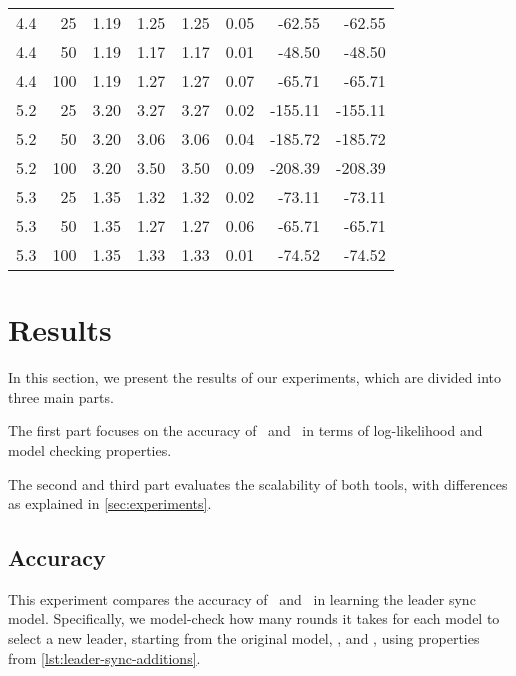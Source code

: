\begin{table}
\begin{tabular}{rrrrrrrr}
        4.4           & 25  & 1.19 & 1.25     & 1.25      & 0.05   & -62.55     & -62.55    \\
        4.4           & 50  & 1.19 & 1.17     & 1.17      & 0.01   & -48.50     & -48.50    \\
        4.4           & 100 & 1.19 & 1.27     & 1.27      & 0.07   & -65.71     & -65.71    \\
        5.2           & 25  & 3.20 & 3.27     & 3.27      & 0.02   & -155.11    & -155.11   \\
        5.2           & 50  & 3.20 & 3.06     & 3.06      & 0.04   & -185.72    & -185.72   \\
        5.2           & 100 & 3.20 & 3.50     & 3.50      & 0.09   & -208.39    & -208.39   \\
        5.3           & 25  & 1.35 & 1.32     & 1.32      & 0.02   & -73.11     & -73.11    \\
        5.3           & 50  & 1.35 & 1.27     & 1.27      & 0.06   & -65.71     & -65.71    \\
        5.3           & 100 & 1.35 & 1.33     & 1.33      & 0.01   & -74.52     & -74.52    \\
        \bottomrule
    \end{tabular}
\end{table}

\section{Results}\label{sec:results}
In this section, we present the results of our experiments, which are divided into three main parts.

The first part focuses on the accuracy of \Jajapy\ and \Cupaal\ in terms of log-likelihood and model checking properties.

The second and third part evaluates the scalability of both tools, with differences as explained in \autoref{sec:experiments}.

\subsection{Accuracy}\label{subsec:accuracy}
This experiment compares the accuracy of \Cupaal\ and \Jajapy\ in learning the leader sync model. Specifically, we model-check how many rounds it takes for each model to select a new leader, starting from the original model, \Jajapy, and \Cupaal, using properties from \autoref{lst:leader-sync-additions}.

